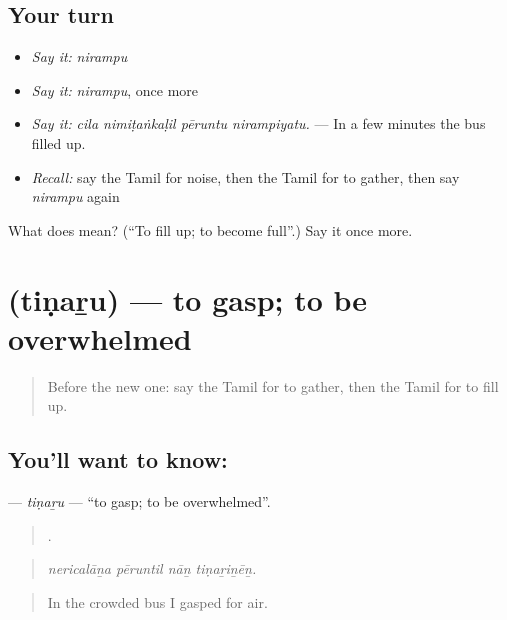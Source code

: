\subsection*{Your turn}
\begin{itemize}
\raggedright
  \item \emph{Say it:} \emph{nirampu}
  \item \emph{Say it:} \emph{nirampu}, once more
  \item \emph{Say it:} \emph{cila nimiṭaṅkaḷil pēruntu nirampiyatu.} — In a few minutes the bus filled up.
  \item \emph{Recall:} say the Tamil for noise, then the Tamil for to gather, then say \emph{nirampu} again
\end{itemize}

\begin{tcolorbox}[breakable,colback=teal!4,colframe=teal!35!black,title={Before you move on}]
What does  mean? (\textquotedblleft{}To fill up; to become full\textquotedblright{}.) Say it once more.
\end{tcolorbox}
\section[\texorpdfstring{\ta{திணறு} (tiṇaṟu)}{திணறு (tiṇaṟu)}]{ (tiṇaṟu) — to gasp; to be overwhelmed}

\label{lesson:TA-C426-tinaru}



\begin{quote}
Before the new one: say the Tamil for to gather, then the Tamil for to fill up.
\end{quote}

\subsection*{You'll want to know: }
\textbf{} — \emph{tiṇaṟu} — \textquotedblleft{}to gasp; to be overwhelmed\textquotedblright{}.

\begin{quote}
   .
\end{quote}

\begin{quote}
\emph{nericalāṉa pēruntil nāṉ tiṇaṟiṉēṉ.}
\end{quote}

\begin{quote}
In the crowded bus I gasped for air.
\end{quote}

